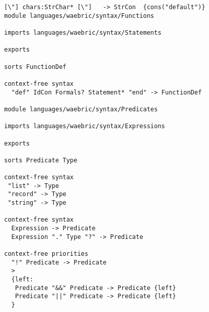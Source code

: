 \documentclass[a4paper]{article}
\begin{document}
\begin{lstlisting}[language=sdf]
    [\"] chars:StrChar* [\"]   -> StrCon  {cons("default")}
module languages/waebric/syntax/Functions

imports languages/waebric/syntax/Statements

exports

sorts FunctionDef

context-free syntax
  "def" IdCon Formals? Statement* "end" -> FunctionDef

module languages/waebric/syntax/Predicates

imports languages/waebric/syntax/Expressions

exports

sorts Predicate Type

context-free syntax
 "list" -> Type
 "record" -> Type
 "string" -> Type

context-free syntax
  Expression -> Predicate
  Expression "." Type "?" -> Predicate

context-free priorities
  "!" Predicate -> Predicate
  >
  {left:
   Predicate "&&" Predicate -> Predicate {left}
   Predicate "||" Predicate -> Predicate {left}
  }
\end{lstlisting}
\end{document}
